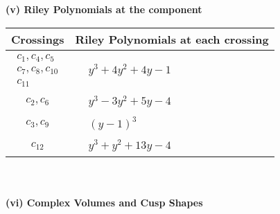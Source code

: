 \documentclass[1p]{elsarticle_modified}
\theoremstyle{definition}
\begin{document}
\newpage\renewcommand{\arraystretch}{1}
\flushleft \textbf{(v) Riley Polynomials at the component}\newline \\
\begin{tabular}{m{50pt}|m{274pt}}
Crossings & \hspace{64pt}Riley Polynomials at each crossing \\
\hline $$\begin{aligned}c_{1},c_{4},c_{5}\\c_{7},c_{8},c_{10}\\c_{11}\end{aligned}$$&$\begin{aligned}
&y^3+4 y^2+4 y-1
\end{aligned}$\\
\hline $$\begin{aligned}c_{2},c_{6}\end{aligned}$$&$\begin{aligned}
&y^3-3 y^2+5 y-4
\end{aligned}$\\
\hline $$\begin{aligned}c_{3},c_{9}\end{aligned}$$&$\begin{aligned}
&(y-1)^3
\end{aligned}$\\
\hline $$\begin{aligned}c_{12}\end{aligned}$$&$\begin{aligned}
&y^3+y^2+13 y-4
\end{aligned}$\\
\hline
\end{tabular}\\~\\
\newpage\flushleft \textbf{(vi) Complex Volumes and Cusp Shapes}
\end{document}

